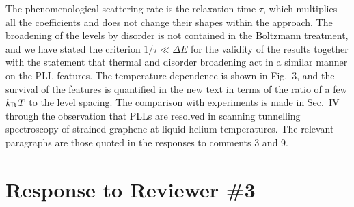 \documentclass[aps,prb,onecolumn,nofootinbib,citeautoscript,10pt]{revtex4-2}
\begin{document}
\begin{enumerate}
The phenomenological scattering rate is the relaxation time $\tau$, which multiplies all the coefficients and does not change their shapes within the approach. The broadening of the levels by disorder is not contained in the Boltzmann treatment, and we have stated the criterion $1/\tau\ll\Delta E$ for the validity of the results together with the statement that thermal and disorder broadening act in a similar manner on the PLL features. The temperature dependence is shown in Fig.~3, and the survival of the features is quantified in the new text in terms of the ratio of a few $k_{\rm B}\,T$ to the level spacing. The comparison with experiments is made in Sec.~IV through the observation that PLLs are resolved in scanning tunnelling spectroscopy of strained graphene at liquid-helium temperatures. The relevant paragraphs are those quoted in the responses to comments 3 and 9.
\end{enumerate}


\section{Response to Reviewer \#3}
\end{document}
